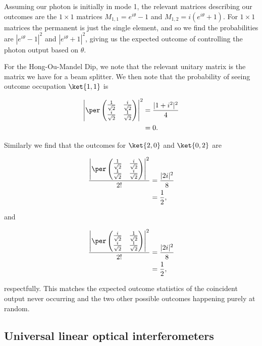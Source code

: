 Assuming our photon is initially in mode 1, the relevant matrices describing our outcomes are the $1\times 1$ matrices $M_{1,1} = e^{i\theta}-1$ and $M_{1,2} = i(e^{i\theta}+1)$. For $1\times 1$ matrices the permanent is just the single element, and so we find the probabilities are $|e^{i\theta}-1|^2$ and $|e^{i\theta}+1|^2$, giving us the expected outcome of controlling the photon output based on $\theta$.

For the Hong-Ou-Mandel Dip, we note that the relevant unitary matrix is the matrix we have for a beam splitter. We then note that the probability of seeing outcome occupation $\ket{1,1}$ is

\begin{align}
\left|\per\begin{pmatrix}\frac{1}{\sqrt{2}}&\frac{i}{\sqrt{2}}\\\frac{i}{\sqrt{2}}&\frac{1}{\sqrt{2}}\end{pmatrix}\right|^2 &= \frac{|1+i^2|^2}{4}\\
&= 0.
\end{align}

Similarly we find that the outcomes for $\ket{2,0}$ and $\ket{0,2}$ are

\begin{align}
\frac{\left|\per\begin{pmatrix}\frac{1}{\sqrt{2}}&\frac{i}{\sqrt{2}}\\\frac{1}{\sqrt{2}}&\frac{i}{\sqrt{2}}\end{pmatrix}\right|^2}{2!} &= \frac{|2i|^2}{8}\\
&= \frac{1}{2},
\end{align}

\noindent and

\begin{align}
\frac{\left|\per\begin{pmatrix}\frac{i}{\sqrt{2}}&\frac{1}{\sqrt{2}}\\\frac{i}{\sqrt{2}}&\frac{1}{\sqrt{2}}\end{pmatrix}\right|^2}{2!} &= \frac{|2i|^2}{8}\\
&= \frac{1}{2},
\end{align}

\noindent respectfully. This matches the expected outcome statistics of the coincident output never occurring and the two other possible outcomes happening purely at random.

\subsection{Universal linear optical interferometers}
\label{ssec:universal-lo}

